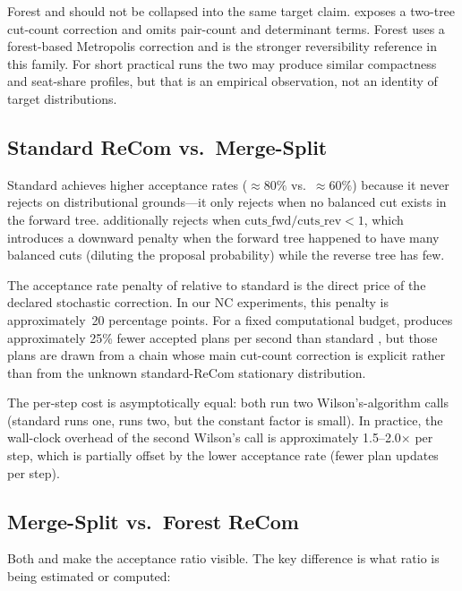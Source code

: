 \begin{remark}
Forest \recom{} and \mergesplit{} should not be collapsed into the same target
claim.
\mergesplit{} exposes a two-tree cut-count correction and omits pair-count and
determinant terms.
Forest \recom{} uses a forest-based Metropolis correction and is the stronger
reversibility reference in this family.
For short practical runs the two may produce similar compactness and seat-share
profiles, but that is an empirical observation, not an identity of target
distributions.
\end{remark}

\subsection{Standard ReCom vs.\ Merge-Split}

Standard \recom{} achieves higher acceptance rates ($\approx\!80\%$ vs.\
$\approx\!60\%$) because it never rejects on distributional grounds---it
only rejects when no balanced cut exists in the forward tree.
\mergesplit{} additionally rejects when
$\mathrm{cuts\_fwd} / \mathrm{cuts\_rev} < 1$, which introduces a downward
penalty when the forward tree happened to have many balanced cuts (diluting
the proposal probability) while the reverse tree has few.

The acceptance rate penalty of \mergesplit{} relative to standard \recom{}
is the direct price of the declared stochastic correction.
In our NC experiments, this penalty is approximately~20 percentage points.
For a fixed computational budget, \mergesplit{} produces approximately 25\%
fewer accepted plans per second than standard \recom{}, but those plans are
drawn from a chain whose main cut-count correction is explicit rather than
from the unknown standard-ReCom stationary distribution.

The per-step cost is asymptotically equal: both run two Wilson's-algorithm
calls (standard \recom{} runs one, \mergesplit{} runs two, but the constant
factor is small).
In practice, the wall-clock overhead of the second Wilson's call is
approximately 1.5--2.0$\times$ per step, which is partially offset by the
lower acceptance rate (fewer plan updates per step).

\subsection{Merge-Split vs.\ Forest ReCom}

Both \mergesplit{} and \forestrecom{} make the acceptance ratio visible.
The key difference is what ratio is being estimated or computed:

